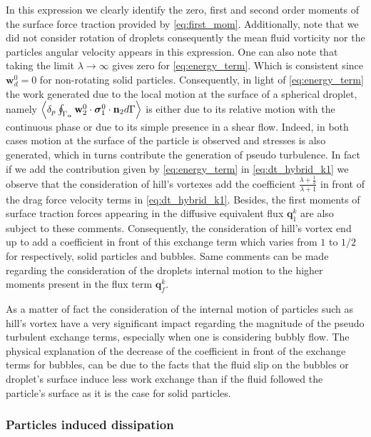 In this expression we clearly identify the zero, first and second order moments of the surface force traction provided by \ref{eq:first_mom}. 
Additionally, note that we did not consider rotation of droplets consequently the mean fluid vorticity nor the particles angular velocity appears in this expression. 
One can also note that taking the limit $\lambda \to \infty$ gives zero for \ref{eq:energy_term}. 
Which is consistent since $\textbf{w}_d^0 = 0$ for non-rotating solid particles. 
Consequently, in light of \ref{eq:energy_term} the work generated due to the local motion at the surface of a spherical droplet, namely  $\left<\delta_{p} \oint_{\Gamma_{\alpha}} \textbf{w}_2^0 \cdot \bm{\sigma}_1^0\cdot\textbf{n}_2 d\Gamma\right>$ is either due to its relative motion with the continuous phase  or due to its simple presence in a shear flow. 
Indeed, in both cases motion at the surface of the particle is observed and stresses is also generated, which in turns contribute the generation of pseudo turbulence. 
In fact if we add the contribution given by \ref{eq:energy_term} in  \ref{eq:dt_hybrid_k1} we observe that  the consideration of hill's vortexes add the coefficient $\frac{\lambda +\frac{1}{2}}{\lambda+1}$ in front of the drag force velocity terms in \ref{eq:dt_hybrid_k1}.
Besides, the first moments of surface traction forces appearing in the diffusive equivalent flux $\textbf{q}_1^k$ are also subject to these comments.  
Consequently, the consideration of hill's vortex end up to add a coefficient in front of this exchange term which varies from $1$ to $1/2$ for respectively, solid particles and bubbles.  
Same comments can be made regarding the consideration of the droplets internal motion to the higher moments present in the flux term $\textbf{q}^k_f$. 

As a matter of fact the consideration of the internal motion of particles such as hill's vortex have a very significant impact regarding the magnitude of the pseudo turbulent exchange terms, especially when one is considering bubbly flow. 
The physical explanation of the decrease of the coefficient in front of the exchange terms for bubbles, can be due to the facts that the fluid slip on the bubbles or droplet's surface induce less work exchange than if the fluid followed the particle's surface as it is the case for solid particles. 

\subsubsection{Particles induced dissipation}


